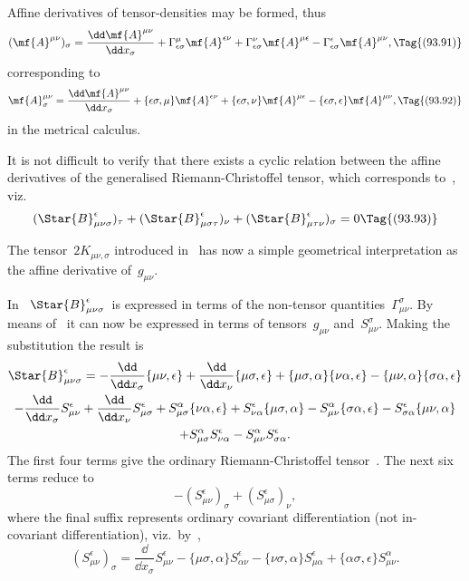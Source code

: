 \documentclass[12pt]{book}
\begin{document}
Affine derivatives of tensor\hyp{}densities may be formed, thus
\[
(\mf{A}^{\mu\nu})_\sigma = \frac{\dd\mf{A}^{\mu\nu}}{\dd x_\sigma}
                         +\Gamma^\mu_{\epsilon\sigma}\mf{A}^{\epsilon\nu}
                         +\Gamma^\nu_{\epsilon\sigma}\mf{A}^{\mu\epsilon}
                         -\Gamma^\epsilon_{\epsilon\sigma}\mf{A}^{\mu\nu},
\Tag{(93.91)}
\]
corresponding to
\[
\mf{A}^{\mu\nu}_\sigma = \frac{\dd\mf{A}^{\mu\nu}}{\dd x_\sigma}
                         +\{\epsilon\sigma,\mu\}\mf{A}^{\epsilon\nu}
                         +\{\epsilon\sigma,\nu\}\mf{A}^{\mu\epsilon}
                         -\{\epsilon\sigma,\epsilon\}\mf{A}^{\mu\nu},
\Tag{(93.92)}
\]
in the metrical calculus.

It is not difficult to verify that there exists a cyclic relation between the affine derivatives of the generalised
Riemann-Christoffel tensor, which corresponds to~, viz.
\[
(\Star{B}^\epsilon_{\mu\nu\sigma})_\tau +
(\Star{B}^\epsilon_{\mu\sigma\tau})_\nu +
(\Star{B}^\epsilon_{\mu\tau\nu})_\sigma = 0
\Tag{(93.93)}
\]

The tensor~$2K_{\mu\nu,\sigma}$ introduced in~ has now a simple geometrical interpretation as the
affine derivative of~$g_{\mu\nu}$.



In~ $\Star{B}_{\mu\nu\sigma}^{\epsilon}$~is expressed in terms of the non-tensor quantities~$\Gamma_{\mu\nu}^{\sigma}$.
By means of~ it can now be expressed in terms of tensors~$g_{\mu\nu}$ and~$S_{\mu\nu}^{\sigma}$.
Making the substitution the result is
\begin{multline*}
  \Star{B}_{\mu\nu\sigma}^{\epsilon}
  = -\frac{\dd}{\dd x_{\sigma}} \{\mu\nu, \epsilon\}
  + \frac{\dd}{\dd x_{\nu}} \{\mu\sigma, \epsilon\}
  + \{\mu\sigma, \alpha\} \{\nu\alpha, \epsilon\}
  - \{\mu\nu, \alpha\} \{\sigma\alpha, \epsilon\} \\
  - \frac{\dd}{\dd x_{\sigma}} S_{\mu\nu}^{\epsilon}
  + \frac{\dd}{\dd x_{\nu}} S_{\mu\sigma}^{\epsilon}
  + S_{\mu\sigma}^{\alpha} \{\nu\alpha, \epsilon\}
  + S_{\nu\alpha}^{\epsilon} \{\mu\sigma, \alpha\}
  - S_{\mu\nu}^{\alpha} \{\sigma\alpha, \epsilon\}
  - S_{\sigma\alpha}^{\epsilon} \{\mu\nu, \alpha\} \\
  + S_{\mu\sigma}^{\alpha} S_{\nu\alpha}^{\epsilon}
  - S_{\mu\nu}^{\alpha} S_{\sigma\alpha}^{\epsilon}.
\end{multline*}
The first four terms give the ordinary Riemann-Christoffel tensor~. The
next six terms reduce to
\[
-(S_{\mu\nu}^{\epsilon})_{\sigma} + (S_{\mu\sigma}^{\epsilon})_{\nu},
\]
where the final suffix represents ordinary covariant differentiation (not in-covariant
differentiation), viz.\ by~,
\[
(S_{\mu\nu}^{\epsilon})_{\sigma}
= \frac{\dd}{\dd x_{\sigma}} S_{\mu\nu}^{\epsilon}
- \{\mu\sigma, \alpha\} S_{\alpha\nu}^{\epsilon}
- \{\nu\sigma, \alpha\} S_{\mu\alpha}^{\epsilon}
+ \{\alpha\sigma, \epsilon\}  S_{\mu\nu}^{\alpha} .
\]
\end{document}
